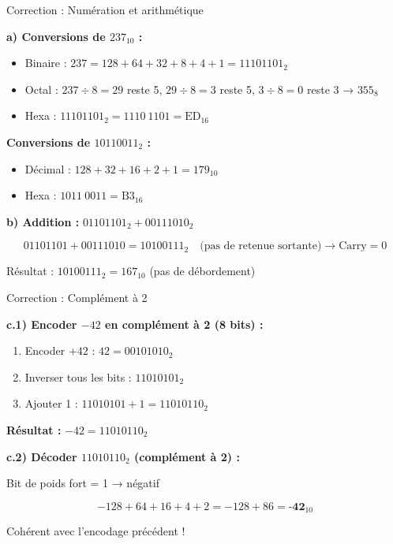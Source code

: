 \documentclass[aspectratio=1610]{beamer}
\begin{document}
\begin{frame}{Correction : Numération et arithmétique}

  \textbf{a) Conversions de $237_{10}$ :}

  \begin{itemize}
    \item Binaire : $237 = 128 + 64 + 32 + 8 + 4 + 1 = 11101101_2$
    \item Octal : $237 \div 8 = 29$ reste 5, $29 \div 8 = 3$ reste 5, $3 \div 8 = 0$ reste 3 → $355_8$
    \item Hexa : $11101101_2 = 1110\ 1101 = \text{ED}_{16}$
  \end{itemize}

  \textbf{Conversions de $10110011_2$ :}

  \begin{itemize}
    \item Décimal : $128 + 32 + 16 + 2 + 1 = 179_{10}$
    \item Hexa : $1011\ 0011 = \text{B3}_{16}$
  \end{itemize}

  \vspace{0.3cm}

  \textbf{b) Addition :} $01101101_2 + 00111010_2$

  \[
    01101101 + 00111010 = 10100111_2 \quad \text{(pas de retenue sortante)} \rightarrow \text{Carry} = 0
  \]

  Résultat : $10100111_2 = 167_{10}$ (pas de débordement)

\end{frame}

\begin{frame}{Correction : Complément à 2}

  \textbf{c.1) Encoder $-42$ en complément à 2 (8 bits) :}

  \begin{enumerate}
    \item Encoder $+42$ : $42 = 00101010_2$
    \item Inverser tous les bits : $11010101_2$
    \item Ajouter 1 : $11010101 + 1 = 11010110_2$
  \end{enumerate}

  \textbf{Résultat :} $-42 = 11010110_2$

  \vspace{0.5cm}

  \textbf{c.2) Décoder $11010110_2$ (complément à 2) :}

  Bit de poids fort = 1 → négatif

  \[
    -128 + 64 + 16 + 4 + 2 = -128 + 86 = \textbf{-42}_{10}
  \]

   Cohérent avec l'encodage précédent !

\end{frame}
\end{document}

